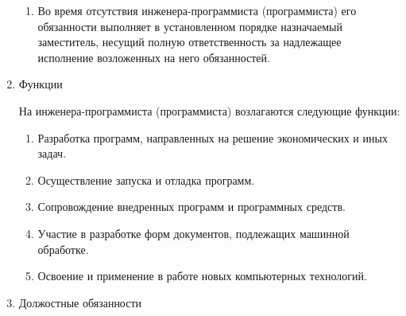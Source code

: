 \documentclass[a4paper,draft]{report}
\begin{document}
\begin{enumerate}
\begin{enumerate}
              \item Во время отсутствия инженера-программиста (программиста) его обязанности выполняет в установленном порядке назначаемый заместитель, несущий полную ответственность за надлежащее исполнение возложенных на него обязанностей.

          \end{enumerate}

    \item Функции

          На инженера-программиста (программиста) возлагаются следующие функции:
          \begin{enumerate}
              \item Разработка программ, направленных на решение экономических и иных задач.
              \item Осуществление запуска и отладка программ.
              \item Сопровождение внедренных программ и программных средств.
              \item Участие в разработке форм документов, подлежащих машинной обработке.
              \item Освоение и применение в работе новых компьютерных технологий.
          \end{enumerate}

    \item Должостные обязанности


\end{enumerate}
\end{document}
